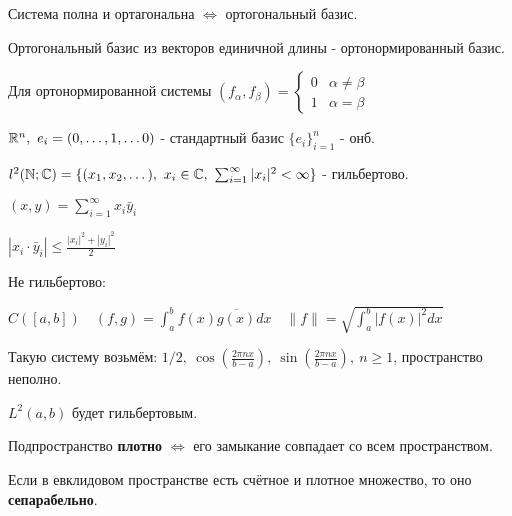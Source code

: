   \begin{definition}
    Система полна и ортагональна $\iff$ ортогональный базис.
  \end{definition}

  \begin{definition}
    Ортогональный базис из векторов единичной длины - ортонормированный базис.
  \end{definition}

  Для ортонормированной системы $(f_\alpha, f_\beta) = \begin{cases}
    0 & \alpha \neq \beta \\ 1 & \alpha = \beta
  \end{cases}$

  \begin{example}
    $\mathbb{R}^n, \ e_i = (0,\dotsc, 1, \dotsc 0)$ - стандартный базис $\{e_i\}^n_{i=1}$ - онб.
  \end{example}

  \begin{example}
    $l^2(\mathbb{N}; \mathbb{C})= \{ (x_1, x_2, \dotsc),\ x_i \in \mathbb{C} ,\ \sum^\infty_{i=1}|x_i|^2 < \infty\}$ - гильбертово.
    
    $(x,y) = \sum^\infty_{i=1}x_i \bar y_i$
    
    $|x_i \cdot \bar y_i| \le \frac{|x_i|^2 + |y_i|^2}{2}$
  \end{example}

  \begin{example} Не гильбертово: 

    $C([a,b]) \quad (f,g) = \int^b_a f(x)\overline{g(x)} dx \quad \|f\| = \sqrt{\int^b_a|f(x)|^2dx}$

    Такую систему возьмём: $1/2, \ \cos(\frac{2\pi nx}{b-a}),\ \sin(\frac{2\pi nx}{b-a}),\ n \ge 1$, пространство неполно.

    $L^2(a,b)$ будет гильбертовым.
  \end{example}

  \begin{definition}
    Подпространство \textbf{плотно} $\iff$ его замыкание совпадает со всем пространством.
  \end{definition}

  \begin{definition}
    Если в евклидовом пространстве есть счётное и плотное множество, то оно \textbf{сепарабельно}.
  \end{definition}


